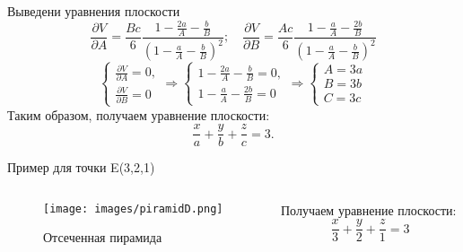 \begin{frame}{Выведени уравнения плоскости}
$$
\frac{\partial V}{\partial A}=\frac{B c}{6} \frac{1-\frac{2 a}{A}-\frac{b}{B}}{\left(1-\frac{a}{A}-\frac{b}{B}\right)^{2}}; \quad\frac{\partial V}{\partial B}=\frac{A c}{6} \frac{1-\frac{a}{A}-\frac{2 b}{B}}{\left(1-\frac{a}{A}-\frac{b}{B}\right)^{2}}
$$
\Large
$$
\left\{\begin{array} { l } 
{ \frac { \partial V } { \partial A } = 0 , } \\
{ \frac { \partial V } { \partial B } = 0 }
\end{array} \Rightarrow \left\{\begin{array} { c } 
{ 1 - \frac { 2 a } { A } - \frac { b } { B } = 0 , } \\
{ 1 - \frac { a } { A } - \frac { 2 b } { B } = 0 }
\end{array} \Rightarrow \left\{\begin{array}{c}
A=3 a \\
B=3 b \\
C=3 c
\end{array}\right.\right.\right.
$$
Таким образом, получаем уравнение плоскости:
$$\frac{x}{a}+\frac{y}{b}+\frac{z}{c}=3 .$$
\end{frame}

\begin{frame}{Пример для точки E(3,2,1)}
\begin{columns}[T]
    \begin{column}{0.48\textwidth}
    \begin{figure}
        \centering
        \texttt{[image: images/piramidD.png]}
        \caption{Отсеченная пирамида}
        \label{fig:pyramid_E_point}
    \end{figure}
    \end{column}
    \begin{column}{0.48\textwidth}
       Получаем уравнение плоскости:
       $$\frac{x}{3}+\frac{y}{2}+\frac{z}{1}=3$$
    \end{column}
\end{columns}
\end{frame}


